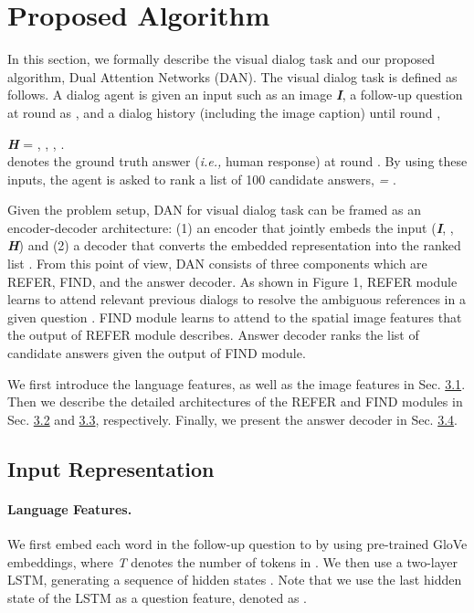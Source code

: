 \documentclass[11pt,a4paper]{article}
\begin{document}
\section{Proposed Algorithm}

In this section, we formally describe the visual dialog task and our proposed algorithm, Dual Attention Networks (DAN). The visual dialog task \cite{das2017visual} is defined as follows. A dialog agent is given an input such as an image {\bf{\it I}}, a follow-up question at round  as {\bf{\it }}, and a dialog history (including the image caption) until round ,

{\bf{\it H}} =  , ,  , . \\  denotes the ground truth answer ({\it i.e.,} human response) at round . By using these inputs, the agent is asked to rank a list of 100 candidate answers, {\it  = }.

Given the problem setup, DAN for visual dialog task can be framed as an encoder-decoder architecture: (1) an encoder that jointly embeds the input ({\bf{\it I}}, {\bf{\it }}, {\bf{\it H}}) and (2) a decoder that converts the embedded representation into the ranked list . From this point of view, DAN consists of three components which are REFER, FIND, and the answer decoder. As shown in Figure 1, REFER module learns to attend relevant previous dialogs to resolve the ambiguous references in a given question {\bf{\it }}. FIND module learns to attend to the spatial image features that the output of REFER module describes. Answer decoder ranks the list of candidate answers  given the output of FIND module.   

We first introduce the language features, as well as the image features in Sec. \hyperref[sec:inputrep]{3.1}. Then we describe the detailed architectures of the REFER and FIND modules in Sec. \hyperref[sec:refer]{3.2} and \hyperref[sec:find]{3.3}, respectively. Finally, we present the answer decoder in Sec. \hyperref[sec:ansdec]{3.4}.

\subsection{Input Representation}
\label{sec:inputrep}
\paragraph{Language Features.} We first embed each word in the follow-up question {\bf{\it }} to {\it } by using pre-trained GloVe \cite{pennington2014glove} embeddings, where {\it T} denotes the number of tokens in {\bf{\it }}. We then use a two-layer LSTM, generating a sequence of hidden states {\it }. Note that we use the last hidden state of the LSTM  as a question feature, denoted as  .  
 
\end{document}

